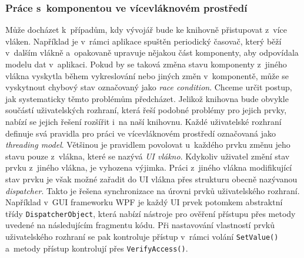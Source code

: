 \subsubsection*{Práce s~komponentou ve vícevláknovém prostředí}
Může docházet k~případům, kdy vývojář bude ke knihovně přistupovat z~více vláken. Například je v~rámci aplikace spuštěn periodický časovač, který běží v~dalším vlákně a~opakovaně upravuje nějakou část komponenty, aby odpovídala modelu dat v~aplikaci. Pokud by se taková změna stavu komponenty z~jiného vlákna vyskytla během vykreslování nebo jiných změn v~komponentě, může se vyskytnout chybový stav označovaný jako \textit{race condition}. Chceme určit postup, jak systematicky těmto problémům předcházet. Jelikož knihovna bude obvykle součástí uživatelských rozhraní, která řeší podobné problémy pro jejich prvky, nabízí se jejich řešení rozšířit i~na naší knihovnu. Každé uživatelské rozhraní definuje svá pravidla pro práci ve vícevláknovém prostředí označovaná jako \textit{threading model}. Většinou je pravidlem povolovat u~každého prvku změnu jeho stavu pouze z~vlákna, které se nazývá \textit{UI vlákno}. Kdykoliv uživatel změní stav prvku z~jiného vlákna, je vyhozena výjimka. Práci z~jiného vlákna modifikující stav prvku je však možné zařadit do UI vlákna přes strukturu obecně nazývanou \textit{dispatcher}. Takto je řešena synchronizace na úrovni prvků uživatelského rozhraní. Například v~GUI frameworku WPF je každý UI prvek potomkem abstraktní třídy \texttt{DispatcherObject}, která nabízí nástroje pro ověření přístupu přes metody uvedené na následujícím fragmentu kódu. Při nastavování vlastností prvků uživatelského rozhraní se pak kontroluje přístup v~rámci volání \texttt{SetValue()} a~metody přístup kontrolují přes \texttt{VerifyAccess()}.

\begin{csharpcode}
public abstract class DispatcherObject {

	public void VerifyAccess() {
      this._dispatcher?.VerifyAccess();
    }

	public void SetValue(DependencyProperty dp, object value) {
      this.VerifyAccess();
\end{csharpcode}

